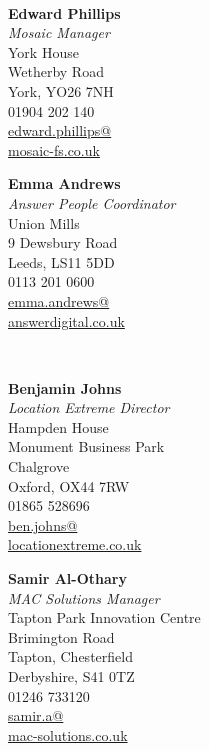 \documentclass[a4paper]{cv}
\begin{document}
\begin{minipage}[t]{0.8\textwidth}
		\vspace{2em}
		\begin{minipage}[t]{0.1\textwidth}\,\end{minipage}
		\begin{minipage}[t]{0.4\textwidth}
			\textbf{Edward Phillips} \\
			\textit{Mosaic Manager} \\
			York House \\
			Wetherby Road \\
			York, YO26 7NH \\
			01904 202 140 \\
			\href{mailto:edward.phillips@mosaic-fs.co.uk}{edward.phillips@\\mosaic-fs.co.uk}
		\end{minipage}
		\begin{minipage}[t]{0.4\textwidth}
			\textbf{Emma Andrews} \\
			\textit{Answer People Coordinator} \\
			Union Mills \\
			9 Dewsbury Road \\
			Leeds, LS11 5DD \\
			0113 201 0600 \\
			\href{mailto:emma.andrews@answerdigital.co.uk}{emma.andrews@\\answerdigital.co.uk}
		\end{minipage}
		
		\vspace{2em}
		\begin{minipage}[t]{0.1\textwidth}\,\end{minipage}
		\begin{minipage}[t]{0.4\textwidth}
			\textbf{Benjamin Johns} \\
			\textit{Location Extreme Director} \\
			Hampden House \\
			Monument Business Park \\
			Chalgrove \\
			Oxford, OX44 7RW \\
			01865 528696 \\
			\href{mailto:ben.johns@locationextreme.co.uk}{ben.johns@\\locationextreme.co.uk}
		\end{minipage}
		\begin{minipage}[t]{0.4\textwidth}
			\textbf{Samir Al-Othary} \\
			\textit{MAC Solutions Manager} \\
			Tapton Park Innovation Centre \\
			Brimington Road \\
			Tapton, Chesterfield \\
			Derbyshire, S41 0TZ \\
			01246 733120 \\
			\href{mailto:samir.a@mac-solutions.co.uk}{samir.a@\\mac-solutions.co.uk}
		\end{minipage}
		

\end{minipage}
\end{document}
